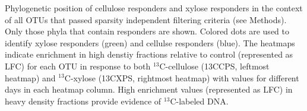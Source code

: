 Phylogenetic position of cellulose responders and xylose responders in the context of all OTUs that passed 
sparsity independent filtering criteria (see Methods). Only those phyla that contain responders are shown.
Colored dots are used to identify xylose responders (green) and cellulse
responders (blue). The heatmaps indicate enrichment in high denstiy fractions
relative to control (represented as LFC) for each OTU in response to both
$^{13}$C-cellulose (13CCPS, leftmost heatmap) and $^{13}$C-xylose
(13CXPS, rightmost heatmap) with values for different days in each heatmap
column. High enrichment values (represented as LFC) in heavy density fractions
provide evidence of $^{13}$C-labeled DNA.  


